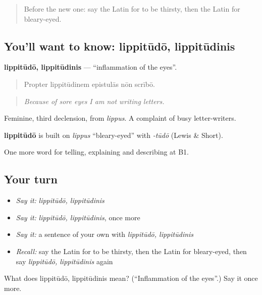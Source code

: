 \label{lesson:LA-C525-lippitudo}



\begin{quote}
Before the new one: say the Latin for to be thirsty, then the Latin for bleary-eyed.
\end{quote}

\subsection*{You'll want to know: lippitūdō, lippitūdinis}
\textbf{lippitūdō, lippitūdinis} — \textquotedblleft{}inflammation of the eyes\textquotedblright{}.

\begin{quote}
Propter lippitūdinem epistulās nōn scrībō.
\end{quote}

\begin{quote}
\emph{Because of sore eyes I am not writing letters.}
\end{quote}

Feminine, third declension, from \emph{lippus}. A complaint of busy letter-writers.

\begin{cousinweb}
\textbf{lippitūdō} is built on \emph{lippus} \textquotedblleft{}bleary-eyed\textquotedblright{} with \emph{-tūdō} (Lewis \& Short).
\end{cousinweb}

\begin{grammarlens}[title={What you've built}]
One more word for telling, explaining and describing at B1.
\end{grammarlens}

\subsection*{Your turn}
\begin{itemize}
\raggedright
  \item \emph{Say it:} \emph{lippitūdō, lippitūdinis}
  \item \emph{Say it:} \emph{lippitūdō, lippitūdinis}, once more
  \item \emph{Say it:} a sentence of your own with \emph{lippitūdō, lippitūdinis}
  \item \emph{Recall:} say the Latin for to be thirsty, then the Latin for bleary-eyed, then say \emph{lippitūdō, lippitūdinis} again
\end{itemize}

\begin{tcolorbox}[breakable,colback=teal!4,colframe=teal!35!black,title={Before you move on}]
What does lippitūdō, lippitūdinis mean? (\textquotedblleft{}Inflammation of the eyes\textquotedblright{}.) Say it once more.
\end{tcolorbox}
